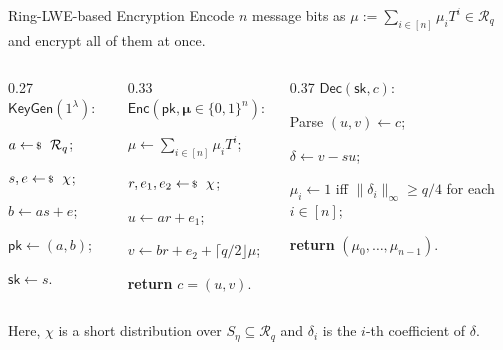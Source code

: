 \documentclass{zkdl-presentation-template}
\begin{document}
    \begin{frame}{Ring-LWE-based Encryption}
        Encode $n$ message bits as $\mu := \sum_{i \in [n]} \mu_iT^i \in \mathcal{R}_q$ and encrypt all of them at once.
        \pause

        \vspace{5pt}
        \footnotesize
        \begin{columns}[T]
            \begin{column}{0.27\textwidth}
                \colorbox{oc-blue-1}{$\mathsf{KeyGen}(1^{\lambda})$:}
                \begin{algoen}
                    \item $a \leftarrowS \mathcal{R}_q$;
                    \item $s, e \leftarrowS \chi$;
                    \item $b \gets as + e$;
                    \item $\mathsf{pk} \gets (a, b)$;
                    \item $\mathsf{sk} \gets s$.
                \end{algoen}
            \end{column}
            \pause
            \begin{column}{0.33\textwidth}
                \colorbox{oc-blue-1}{$\mathsf{Enc}(\mathsf{pk}, \boldsymbol{\mu} \in \{0,1\}^n)$:}
                \begin{algoen}
                    \item $\mu \gets \sum_{i \in [n]} \mu_i T^i$;
                    \item $r, e_1, e_2 \leftarrowS \chi$;
                    \item $u \gets ar + e_1$;
                    \item $v \gets br + e_2 + \lceil q/2 \rfloor \mu$;
                    \item \textbf{return} $c = (u, v)$.
                \end{algoen}
            \end{column}
            \pause
            \begin{column}{0.37\textwidth}
                \colorbox{oc-blue-1}{$\mathsf{Dec}(\mathsf{sk}, c)$:}
                \begin{algoen}
                    \item Parse $(u, v) \gets c$;
                    \item $\delta \gets v - su$;
                    \item $\mu_i \gets 1$ iff $\|\delta_i\|_{\infty} \geq q/4$ for each $i \in [n]$;
                    \item \textbf{return} $(\mu_0,\dots,\mu_{n-1})$.
                \end{algoen}
            \end{column}
        \end{columns}
        \normalsize
        \vspace{5pt}

        Here, $\chi$ is a short distribution over $S_{\eta} \subseteq \mathcal{R}_q$ and $\delta_i$ is the $i$-th coefficient of $\delta$.
    \end{frame}
\end{document}
